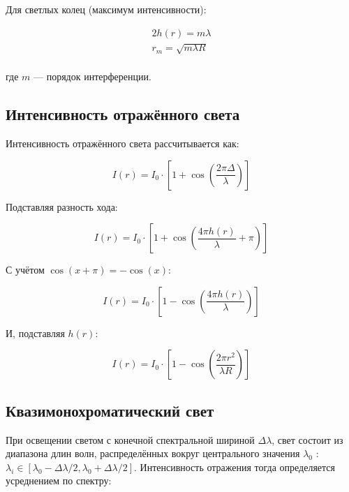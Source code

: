 \documentclass[a4paper,11pt]{article}
\theoremstyle{definition}
\begin{document}
    Для светлых колец (максимум интенсивности):

    \begin{gather}
        2h(r) = m \lambda\\
        r_m = \sqrt{m \lambda R}\\
    \end{gather}

    где \( m \) — порядок интерференции.

    \subsection{Интенсивность отражённого света}
    Интенсивность отражённого света рассчитывается как:

    \begin{equation}
        I(r) = I_0 \cdot \left[1 + \cos\left(\frac{2\pi \Delta}{\lambda} \right)\right]\label{eq:equation3}
    \end{equation}

    Подставляя разность хода:

    \begin{equation}
        I(r) = I_0 \cdot \left[1 + \cos\left(\frac{4\pi h(r)}{\lambda} + \pi \right)\right]\label{eq:equation4}
    \end{equation}

    С учётом \( \cos(x + \pi) = -\cos(x) \):

    \begin{equation}
        I(r) = I_0 \cdot \left[1 - \cos\left(\frac{4\pi h(r)}{\lambda} \right)\right]\label{eq:equation5}
    \end{equation}

    И, подставляя \( h(r) \):

    \begin{equation}
        I(r) = I_0 \cdot \left[1 - \cos\left(\frac{2\pi r^2}{\lambda R} \right)\right]\label{eq:equation6}
    \end{equation}

    \subsection{Квазимонохроматический свет}
    При освещении светом с конечной спектральной шириной \( \Delta\lambda \), свет состоит из диапазона
    длин волн, распределённых вокруг центрального значения \(\lambda_0\) : \( \lambda_i \in [\lambda_0 - \Delta\lambda/2, \lambda_0 + \Delta\lambda/2] \).
    Интенсивность отражения тогда определяется усреднением по спектру:
\end{document}
